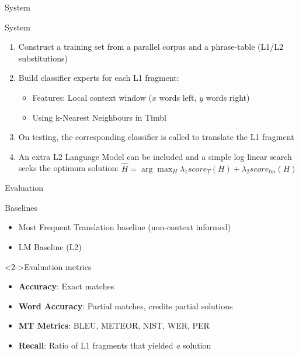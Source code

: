 \documentclass[compress]{beamer}
\begin{document}
\begin{frame}{System}

\begin{block}{System}
  \begin{enumerate}
    \item Construct a training set from a parallel corpus and a phrase-table
      (L1/L2 substitutions)
    \item Build classifier experts for each L1 fragment:
    \begin{itemize}
      \item<2-> Features: Local context window ($x$ words left, $y$ words right)
      \item<2-> Using k-Nearest Neighbours in Timbl
    \end{itemize}
    \item<3-> On testing, the corresponding classifier is called to translate the L1
    fragment
    \item<4-> An extra L2 Language Model can be included and a simple log
      linear search seeks the optimum solution: 
      $\hat{H} = \arg\max_H \lambda_1 score_T(H) + \lambda_2 score_{lm}(H)$
  \end{enumerate}
\end{block}

\end{frame}


\begin{frame}{Evaluation}
  \begin{block}{Baselines}
    \begin{itemize}
      \item Most Frequent Translation baseline {\footnotesize (non-context informed)} 
      \item LM Baseline (L2)
    \end{itemize}
  \end{block}
  
  \begin{block}<2->{Evaluation metrics}
    \begin{itemize}
      \item \textbf{Accuracy}: Exact matches
      \item \textbf{Word Accuracy}: Partial matches, credits partial solutions
      \item \textbf{MT Metrics}: BLEU, METEOR, NIST, WER, PER
      \item \textbf{Recall}: Ratio of L1 fragments that yielded \emph{a} solution
    \end{itemize}
  \end{block}
\end{frame}
\end{document}
